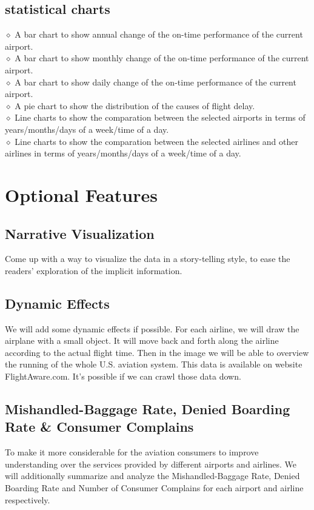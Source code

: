 \documentclass[12pt]{article}
\begin{document}
    \subsection{statistical charts}
    \noindent $\diamond$ A bar chart to show annual change of the on-time performance of the current airport.\\
    $\diamond$ A bar chart to show monthly change of the on-time performance of the current airport.\\
    $\diamond$ A bar chart to show daily change of the on-time performance of the current airport.\\
    $\diamond$ A pie chart to show the distribution of the causes of flight delay.\\
    $\diamond$ Line charts to show the comparation between the selected airports in terms of years/months/days of a week/time of a day.\\
    $\diamond$ Line charts to show the comparation between the selected airlines and other airlines in terms of years/months/days of a week/time of a day.\\

\section{Optional Features}
    \subsection{Narrative Visualization}
    Come up with a way to visualize the data in a story-telling style, to ease the readers' exploration of the implicit information. 
    \subsection{Dynamic Effects}
    We will add some dynamic effects if possible. For each airline, we will draw the airplane with a small object. It will move back and forth along the airline according to the actual flight time. Then in the image we will be able to overview the running of the whole U.S. aviation system.
    This data is available on website FlightAware.com. It's possible if we can crawl those data down.
    \subsection{Mishandled-Baggage Rate, Denied Boarding Rate \& Consumer Complains}
    To make it more considerable for the aviation consumers to improve understanding over the services provided by different airports and airlines. We will additionally summarize and analyze the Mishandled-Baggage Rate, Denied Boarding Rate and Number of Consumer Complains for each airport and airline respectively.
\end{document}
